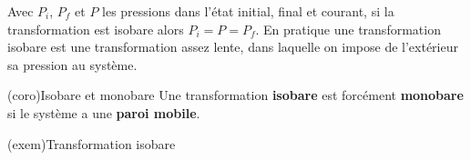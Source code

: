\documentclass[../../main/main.tex]{subfiles}
\begin{document}
Avec $P_i$, $P_f$ et $P$ les pressions dans l'état initial, final et courant, si
la transformation est isobare alors $P_i = P = P_f$. En pratique une
transformation isobare est une transformation assez lente, dans laquelle on
impose de l'extérieur sa pression au système.

\begin{tcb}[cnt](coro){Isobare et monobare}
	Une transformation \textbf{isobare} est forcément \textbf{monobare} si le
	système a une \textbf{paroi mobile}.
\end{tcb}

\begin{tcb}[sidebyside](exem){Transformation isobare}
	\tcblower
	\begin{center}
		\vspace{-15pt}
	\end{center}
\end{tcb}
\end{document}
